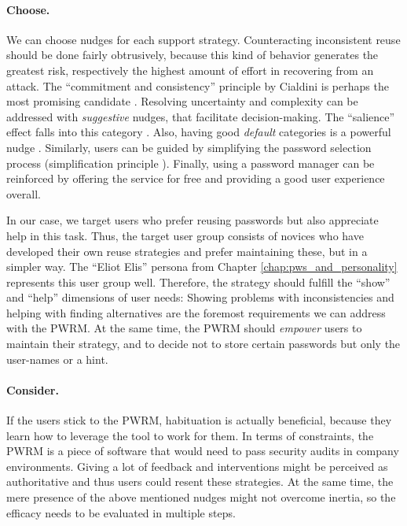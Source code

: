 \paragraph{Choose.} We can choose nudges for each support strategy. Counteracting inconsistent reuse should be done fairly obtrusively, because this kind of behavior generates the greatest risk, respectively the highest amount of effort in recovering from an attack. The ``commitment and consistency'' principle by Cialdini is perhaps the most promising candidate \cite{Cialdini2007Influence}. Resolving uncertainty and complexity can be addressed with \textit{suggestive} nudges, that facilitate decision-making. The ``salience'' effect falls into this category \cite{Coventry2014SCENEBehavioralNudges}. Also, having good \textit{default} categories is a powerful nudge \cite{Cranor2008FrameworkReasoning}. Similarly, users can be guided by simplifying the password selection process (simplification principle \cite{Forget2007PersuasionEducationSecurity}). Finally, using a password manager can be reinforced by offering the service for free and providing a good user experience overall. 

In our case, we target users who prefer reusing passwords but also appreciate help in this task. Thus, the target user group consists of novices who have developed their own reuse strategies and prefer maintaining these, but in a simpler way. The ``Eliot Elis'' persona from Chapter \ref{chap:pws_and_personality} represents this user group well. Therefore, the strategy should fulfill the ``show'' and ``help'' dimensions of user needs: Showing problems with inconsistencies and helping with finding alternatives are the foremost requirements we can address with the PWRM. At the same time, the PWRM should \textit{empower} users to maintain their strategy, and to decide not to store certain passwords but only the user-names or a hint. 

\paragraph{Consider.}
If the users stick to the PWRM, habituation is actually beneficial, because they learn how to leverage the tool to work for them. In terms of constraints, the PWRM is a piece of software that would need to pass security audits in company environments. Giving a lot of feedback and interventions might be perceived as authoritative and thus users could resent these strategies. At the same time, the mere presence of the above mentioned nudges might not overcome inertia, so the efficacy needs to be evaluated in multiple steps. 


